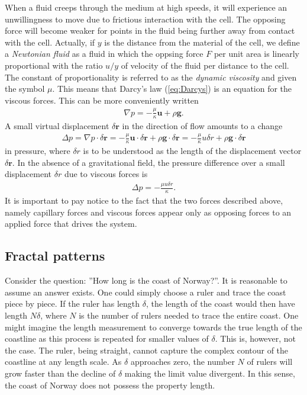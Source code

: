 \documentclass[twoside,utf8]{article}
\newcommand{\EQU}[1] { \begin{equation*} \begin{split} #1 \end{split} \end{equation*} }
\newcommand{\EQUn}[1] { \begin{equation} \begin{split} #1 \end{split} \end{equation} }
\begin{document}
When a fluid creeps through the medium at high speeds, it will experience an unwillingness to move due to frictious interaction with the cell. The opposing force will become weaker for points in the fluid being further away from contact with the cell. Actually, if $y$ is the distance from the material of the cell, we define a {\it Newtonian fluid} as a fluid in which the oppsing force $F$ per unit area is linearly proportional with the ratio $u/y$ of velocity of the fluid per distance to the cell. The constant of proportionality is referred to as the {\it dynamic viscosity} and given the symbol $\mu$. This means that Darcy's law (\ref{eq:Darcys}) is an equation for the viscous forces. This can be more conveniently written
\EQUn{
\nabla p = -\frac{\mu}{\kappa}\mathbf{u} + \rho \mathbf{g}. \label{eq:invertedDarcy}
}
A small virtual displacement $\delta \mathbf{r}$ in the direction of flow amounts to a change
\EQU{
\Delta p
= \nabla p\cdot \delta \mathbf{r}
= -\frac{\mu}{\kappa}\mathbf{u}\cdot \delta \mathbf{r}  + \rho \mathbf{g}\cdot \delta \mathbf{r}
= -\frac{\mu}{\kappa}u\delta r  + \rho \mathbf{g}\cdot \delta \mathbf{r}
}
in pressure, where $\delta r$ is to be understood as the length of the displacement vector $\delta \mathbf{r}$. In the absence of a gravitational field, the pressure difference over a small displacement $\delta r$ due to viscous forces is
\EQUn{
\Delta p
= -\frac{\mu u\delta r}{\kappa}.  \label{eq:viscousForces}
}
It is important to pay notice to the fact that the two forces described above, namely capillary forces and viscous forces appear only as opposing forces to an applied force that drives the system.




\subsection{Fractal patterns}
Consider the question: ''How long is the coast of Norway?''. It is reasonable to assume an answer exists. One could simply choose a ruler and trace the coast piece by piece. If the ruler has length $\delta$, the length of the coast would then have length $N\delta$, where $N$ is the number of rulers needed to trace the entire coast. One might imagine the length measurement to converge towards the true length of the coastline as this process is repeated for smaller values of $\delta$. This is, however, not the case. The ruler, being straight, cannot capture the complex contour of the coastline at any length scale. As $\delta$ approaches zero, the number $N$ of rulers will grow faster than the decline of $\delta$ making the limit value divergent. In this sense, the coast of Norway does not possess the property length.
\end{document}
